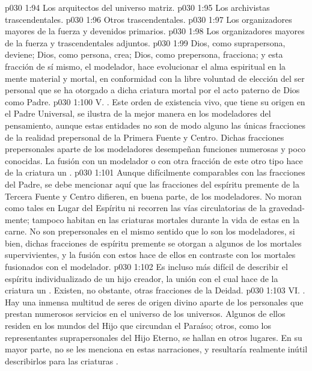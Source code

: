 \vs p030 1:94 Los arquitectos del universo matriz.
\vs p030 1:95 Los archivistas trascendentales.
\vs p030 1:96 Otros trascendentales.
\vs p030 1:97 Los organizadores mayores de la fuerza y devenidos primarios.
\vs p030 1:98 Los organizadores mayores de la fuerza y trascendentales adjuntos.
\vs p030 1:99 \pc Dios, como suprapersona, deviene; Dios, como persona, crea; Dios, como prepersona, fracciona; y esta fracción de sí mismo, el modelador, hace evolucionar el alma espiritual en la mente material y mortal, en conformidad con la libre voluntad de elección del ser personal que se ha otorgado a dicha criatura mortal por el acto paterno de Dios como Padre.
\vs p030 1:100 \pc V. . Este orden de existencia vivo, que tiene su origen en el Padre Universal, se ilustra de la mejor manera en los modeladores del pensamiento, aunque estas entidades no son de modo alguno las únicas fracciones de la realidad prepersonal de la Primera Fuente y Centro. Dichas fracciones prepersonales aparte de los modeladores desempeñan funciones numerosas y poco conocidas. La fusión con un modelador o con otra fracción de este otro tipo hace de la criatura un .
\vs p030 1:101 Aunque difícilmente comparables con las fracciones del Padre, se debe mencionar aquí que las fracciones del espíritu premente de la Tercera Fuente y Centro difieren, en buena parte, de los modeladores. No moran como tales en Lugar del Espíritu ni recorren las vías circulatorias de la gravedad\hyp{}mente; tampoco habitan en las criaturas mortales durante la vida de estas en la carne. No son prepersonales en el mismo sentido que lo son los modeladores, si bien, dichas fracciones de espíritu premente se otorgan a algunos de los mortales supervivientes, y la fusión con estos hace de ellos  en contraste con los mortales fusionados con el modelador.
\vs p030 1:102 Es incluso más difícil de describir el espíritu individualizado de un hijo creador, la unión con el cual hace de la criatura un . Existen, no obstante, otras fracciones de la Deidad.
\vs p030 1:103 \pc VI. . Hay una inmensa multitud de seres de origen divino aparte de los personales que prestan numerosos servicios en el universo de los universos. Algunos de ellos residen en los mundos del Hijo que circundan el Paraíso; otros, como los representantes suprapersonales del Hijo Eterno, se hallan en otros lugares. En su mayor parte, no se les menciona en estas narraciones, y resultaría realmente inútil describirlos para las criaturas .
